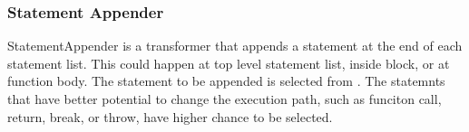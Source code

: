 \subsubsection{Statement Appender}
StatementAppender is a transformer that appends a statement at the end of each statement list.
This could happen at top level statement list, inside block, or at function body.  The statement
to be appended is selected from . The statemnts that have better potential
to change the execution path, such as funciton call, return, break, or throw, have higher chance
to be selected.

